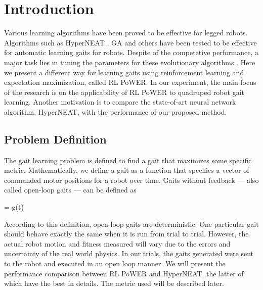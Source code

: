 \section{Introduction}


Various learning algorithms have been proved to be effective for
legged robots. Algorithms such as HyperNEAT \cite{yosinski2011evolving-robot-gaits},
GA \cite{chernova2004an-evolutionary-approach-to-gait} and others \cite{hornby2005autonomous-evolution-of-dynamic} \cite{zykov2004evolving-dynamic-gaits} \cite{tellez2006evolving-the-walking-behaviour} \cite{valsalam2008modular-neuroevolution-for-multilegged} have been tested to be effective for automatic learning gaits for robots. Despite of the competetive performance, a major
task lies in tuning the parameters for
these evolutionary algorithms \cite{kormushev2011bipedal-walking-energya}. Here we present a
different way for learning gaits using reinforcement learning and expectation maximization, called RL PoWER. In our
experiment, the main focus of the research is on the applicability of RL PoWER to quadruped robot gait learning. Another motivation is to compare the state-of-art neural network algorithm, HyperNEAT, with the performance of our proposed method.

\subsection{Problem Definition}
The gait learning problem is defined to find a
gait that maximizes some specific metric. Mathematically, we define a
gait as a function that specifies a vector of commanded motor
positions for a robot over time. Gaits without feedback --- also
called open-loop gaits --- can be defined as 

\be{} = g(t)\ee

According to this definition, open-loop gaits are deterministic. One
particular gait should behave exactly the same when it is run from
trial to trial. However, the actual robot motion and fitness measured
will vary due to the errors and uncertainty of the real world physics. In our
trials, the gaits generated were sent to the robot and
executed in an open loop manner. We will present the performance comparison between
RL PoWER and HyperNEAT.  the latter of which have the best in details. The metric used will be
described later.

